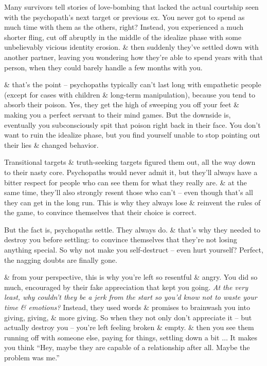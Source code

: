 \documentclass{article}
\numberwithin{equation}{section}
\begin{document}
Many survivors tell stories of love-bombing that lacked the actual courtship seen with the psychopath's next target or previous ex. You never got to spend as much time with them as the others, right? Instead, you experienced a much shorter fling, cut off abruptly in the middle of the idealize phase with some unbelievably vicious identity erosion. \& then suddenly they've settled down with another partner, leaving you wondering how they're able to spend years with that person, when they could barely handle a few months with you.

\& that's the point -- psychopaths typically can't last long with empathetic people (except for cases with children \& long-term manipulation), because you tend to absorb their poison. Yes, they get the high of sweeping you off your feet \& making you a perfect servant to their mind games. But the downside is, eventually you subconsciously spit that poison right back in their face. You don't want to ruin the idealize phase, but you find yourself unable to stop pointing out their lies \& changed behavior.

Transitional targets \& truth-seeking targets figured them out, all the way down to their nasty core. Psychopaths would never admit it, but they'll always have a bitter respect for people who can see them for what they really are. \& at the same time, they'll also strongly resent those who can't -- even though that's all they can get in the long run. This is why they always lose \& reinvent the rules of the game, to convince themselves that their choice is correct.

But the fact is, psychopaths settle. They always do. \& that's why they needed to destroy you before settling: to convince themselves that they're not losing anything special. So why not make you self-destruct -- even hurt yourself? Perfect, the nagging doubts are finally gone.

\& from your perspective, this is why you're left so resentful \& angry. You did so much, encouraged by their fake appreciation that kept you going. \textit{At the very least, why couldn't they be a jerk from the start so you'd know not to waste your time \& emotions?} Instead, they used words \& promises to brainwash you into giving, giving, \& more giving. So when they not only don't appreciate it -- but actually destroy you -- you're left feeling broken \& empty. \& then you see them running off with someone else, paying for things, settling down a bit $\ldots$ It makes you think ``Hey, maybe they are capable of a relationship after all. Maybe the problem was me.''
\end{document}
